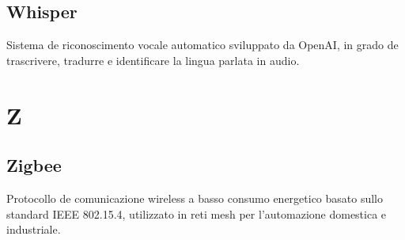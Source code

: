 \documentclass[a4paper,11pt]{article}
\begin{document}
\subsection{Whisper}
Sistema de riconoscimento vocale automatico sviluppato da OpenAI, in grado de trascrivere, tradurre e identificare la lingua parlata in audio.

\newpage
\section{Z}

\subsection{Zigbee}
Protocollo de comunicazione wireless a basso consumo energetico basato sullo standard IEEE 802.15.4, utilizzato in reti mesh per l'automazione domestica e industriale.

\printglossaries
\end{document}
